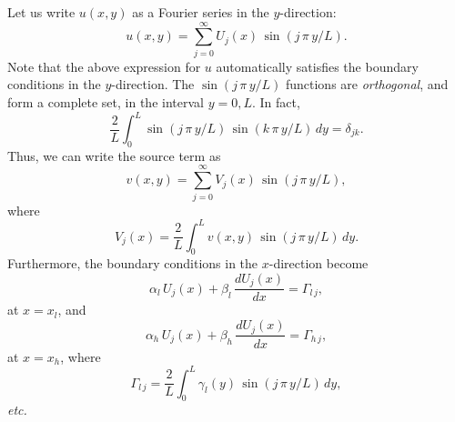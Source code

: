 Let us write $u(x,y)$ as a Fourier series in the $y$-direction:
\begin{equation}\label{e545}
u(x,y) = \sum_{j=0}^{\infty} U_j(x)\,\sin(j\,\pi\,y/L).
\end{equation}
Note that the above expression for $u$ automatically satisfies the boundary conditions
in the $y$-direction. The $\sin(j\,\pi\,y/L)$ functions are {\em orthogonal}, and form a complete set, in
the interval $y=0,L$. In fact,
\begin{equation}
\frac{2}{L}\int_0^L \sin(j\,\pi\,y/L)\,\sin(k\,\pi\,y/L)\,dy = \delta_{jk}.
\end{equation}
Thus, we can write the source term as
\begin{equation}\label{e547}
v(x,y) = \sum_{j=0}^{\infty} V_j(x)\,\sin(j\,\pi\,y/L),
\end{equation}
where
\begin{equation}\label{ffta1}
V_j(x) = \frac{2}{L} \int_0^L v(x,y)\,\sin(j\,\pi\,y/L)\,dy.
\end{equation}
Furthermore, the boundary conditions in the $x$-direction become
\begin{equation}\label{e549}
\alpha_l\,U_j(x) + \beta_l\,\frac{dU_j(x)}{dx} = \Gamma_{l\,j},
\end{equation}
at $x=x_l$, and
\begin{equation}\label{e550}
\alpha_h\,U_j(x)+ \beta_h\,\frac{dU_j(x)}{dx} = \Gamma_{h\,j},
\end{equation}
at $x=x_h$, where
\begin{equation}\label{ffta2}
\Gamma_{l\,j} = \frac{2}{L} \int_0^L \gamma_l(y)\,\sin(j\,\pi\,y/L)\,dy,
\end{equation}
{\em etc.}

